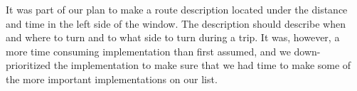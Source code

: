 It was part of our plan to make a route description located under the distance and time in the left side of the window. The description should describe when and where to turn and to what side to turn during a trip. It was, however, a more time consuming implementation than first assumed, and we down-prioritized the implementation to make sure that we had time to make some of the more important implementations on our list. 
